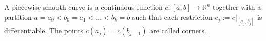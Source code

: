 A piecewise smooth curve is a continuous function $c: [a, b] \to \mathbb{R}^n$ together with a partition $a = a_0 < b_0 = a_1 < \ldots < b_k = b$ such that each restriction $c_j := c|_{[a_j, b_j]}$ is differentiable. The points $c(a_j) = c(b_{j-1})$ are called corners.